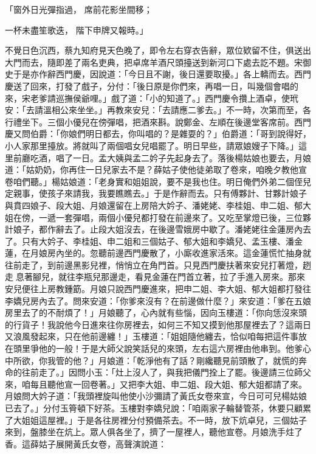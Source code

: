 「窗外日光彈指過，  席前花影坐間移；

一杯未盡笙歌迭，  階下申牌又報時。」

不覺日色沉西，蔡九知府見天色晚了，即令左右穿衣告辭，眾位欵留不住，俱送出大門而去，隨即差了兩名吏典，把卓席羊酒尺頭擡送到新河口下處去訖不題。宋御史于是亦作辭西門慶，因說道：「今日且不謝，後日還要取擾。」各上轎而去。西門慶送了回來，打發了戲子，分付：「後日原是你們來，再唱一日，叫幾個會唱的來，宋老爹請巡撫侯爺哩。」戲了道：「小的知道了。」西門慶令攢上酒卓，使玳安：「去請溫相公來坐坐。」再教來安兒：「去請應二爹去。」不一時，次第而至，各行禮坐下。三個小優兒在傍彈唱，把酒來斟。說鄭金、左順在後邊堂客席前。西門慶又問伯爵：「你娘們明日都去，你叫唱的？是雜耍的？」伯爵道：「哥到說得好，小人家那里擡放。將就叫了兩個唱女兒唱罷了。明日早些，請眾娘嫂子下降。」這里前廳吃酒，唱了一日。孟大姨與孟二妗子先起身去了。落後楊姑娘也要去，月娘道：「姑奶奶，你再住一日兒家去不是？薛姑子使他徒弟取了卷來，咱晚夕教他宣卷咱們聽。」楊姑娘道：「老身實和姐姐說，要不是我也住。明日俺們外弟二個侄兒定親事，使孩子來請我，我要瞧瞧去。」于是作辭而去。只有傅夥計、甘夥計娘子與賁四娘子、段大姐、月娘還留在上房陪大妗子、潘姥姥、李桂姐、申二姐、郁大姐在傍，一遞一套彈唱，兩個小優兒都打發在前邊來了。又吃至掌燈已後，三位夥計娘子，都作辭去了。止段大姐沒去，在後邊雪娥房中歇了。潘姥姥往金蓮房內去了。只有大妗子、李桂姐、申二姐和三個姑子、郁大姐和李嬌兒、孟玉樓、潘金蓮，在月娘房內坐的。忽聽前邊西門慶散了，小廝收進家活來。這金蓮慌忙抽身就往前走了，到前邊黑影兒裡，悄悄立在角門首。只見西門慶扶著來安兒打著燈，趔走息著腳兒，就往李瓶兒那邊走，看見金蓮在門首立著，拉了手進入房來。那來安兒便往上房教鍾筯。月娘只說西門慶進來，把申二姐、李大姐、郁大姐都打發往李嬌兒房內去了。問來安道：「你爹來沒有？在前邊做什麼？」來安道：「爹在五娘房里去了的不耐煩了！」月娘聽了，心內就有些惱，因向玉樓道：「你向恁沒來頭的行貨子！我說他今日進來往你房裡去，如何三不知又摸到他那屋裡去了？這兩日又浪風發起來，只在他前邊纏！」玉樓道：「姐姐隨他纏去，恰似咱每把這件事放在頭里爭他的一般！于是大師父說笑話兒的來頭，左右這六房裡由他串到。他爹心中所欲，你我管的他？」月娘道：「乾淨他有了話？剛纔聽見前頭散了，就慌的奔命的往前走了。」因問小玉：「灶上沒人了，與我把儀門拴上了罷。後邊請三位師父來，咱每且聽他宣一回卷著。」又把李大姐、申二姐、段大姐、郁大姐都請了來。月娘問大妗子道：「我頭裡旋叫他使小沙彌請了黃氏女卷來宣，今日可可兒楊姑娘已去了。」分付玉筲頓下好茶。玉樓對李嬌兒說：「咱兩家子輪替管茶，休要只顧累了大姐姐這屋裡。」于是各往房裡分付預備茶去。不一時，放下炕卓兒，三個姑子來到，盤膝坐在炕上。眾人俱各坐了，擠了一屋裡人，聽他宣卷。月娘洗手炷了香。這薛姑子展開黃氏女卷，高聲演說道：

